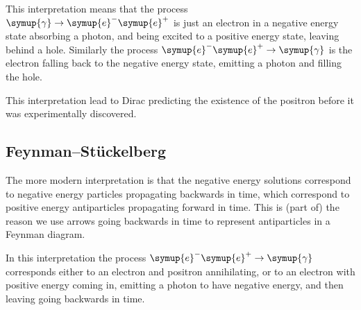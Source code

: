 \documentclass[fleqn]{NotesClass}
\newcommand{\Pparticle}[1]{\symup{#1}}
\newcommand{\Pe}{\ensuremath{\Pparticle{e}^{-}}}
\newcommand{\Pphoton}{\ensuremath{\Pparticle{\gamma}}}
\newcommand{\APe}{\ensuremath{\Pparticle{e}^{+}}}
\begin{document}
    This interpretation means that the process \(\Pphoton \to \Pe \APe\) is just an electron in a negative energy state absorbing a photon, and being excited to a positive energy state, leaving behind a hole.
    Similarly the process \(\Pe\APe\to\Pphoton\) is the electron falling back to the negative energy state, emitting a photon and filling the hole.
    
    This interpretation lead to Dirac predicting the existence of the positron before it was experimentally discovered.
    
    \subsection{Feynman--St\"uckelberg}
    The more modern interpretation is that the negative energy solutions correspond to negative energy particles propagating backwards in time, which correspond to positive energy antiparticles propagating forward in time.
    This is (part of) the reason we use arrows going backwards in time to represent antiparticles in a Feynman diagram.
    
    In this interpretation the process \(\Pe\APe \to \Pphoton\) corresponds either to an electron and positron annihilating, or to an electron with positive energy coming in, emitting a photon to have negative energy, and then leaving going backwards in time.
    
\end{document}
